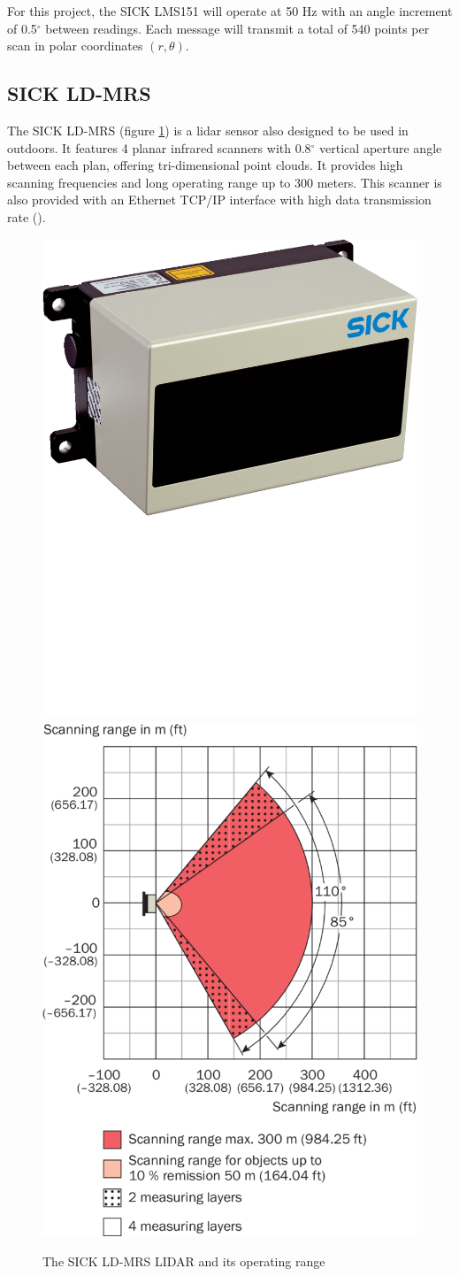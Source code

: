 For this project, the SICK LMS151 will operate at 50 Hz with an angle increment of 0.5$^{\circ}$ between readings. Each message will transmit a total of 540 points per scan in polar coordinates $(r,\theta)$. \cite{SICK}

\subsection{SICK LD-MRS}

The SICK LD-MRS (figure \ref{fig:sickldmrs}) is a \gls{lidar} sensor also designed to be used in outdoors. It features 4 planar infrared scanners with 0.8$^{\circ}$ vertical aperture angle between each plan, offering tri-dimensional point clouds. It provides high scanning frequencies and long operating range up to 300 meters. This scanner is also provided with an Ethernet TCP/IP interface with high data transmission rate (\cite{SICKa}).

\begin{figure}[htp]
	
	\centering
	\hfill
	\includegraphics[width=.4\textwidth]{capexp/imgs/sickldmrs}\hfill
	\includegraphics[width=.5\textwidth]{capexp/imgs/sickldmrs2}\hfill
	
	\caption{The SICK LD-MRS LIDAR and its operating range}
	\label{fig:sickldmrs}
	
\end{figure}

